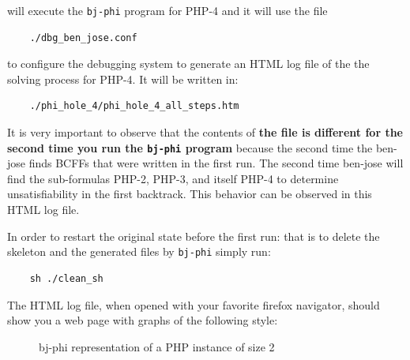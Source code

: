 \documentclass{easychair}
\newcommand{\skeleton}{\textsf{skeleton}}
\newcommand{\bjphi}{\texttt{bj-phi}}
\begin{document}
will execute the {\bjphi} program for PHP-4 and it will use the file 

\begin{verbatim}
	./dbg_ben_jose.conf
\end{verbatim}

to configure the debugging system to generate an HTML log file of the the solving process for PHP-4. It will be written in:

\begin{verbatim}
	./phi_hole_4/phi_hole_4_all_steps.htm
\end{verbatim}

It is very important to observe that the contents of \textbf{the file is different for the second time you run the {\bjphi} program} because the second time the ben-jose finds BCFFs that were written in the first run. The second time ben-jose will find the sub-formulas PHP-2, PHP-3, and itself PHP-4 to determine unsatisfiability in the first backtrack. This behavior can be observed in this HTML log file.

In order to restart the original state before the first run: that is to delete the {\skeleton} and the generated files by {\bjphi} simply run:

\begin{verbatim}
	sh ./clean_sh
\end{verbatim}


The HTML log file, when opened with your favorite firefox navigator, should show you a web page with graphs of the following style:


\begin{figure}[H]
	\begin{centering}
		\caption{bj-phi representation of a PHP instance of size 2}
		\label{fig:h2-graph}
	\end{centering}
\end{figure}
\end{document}
